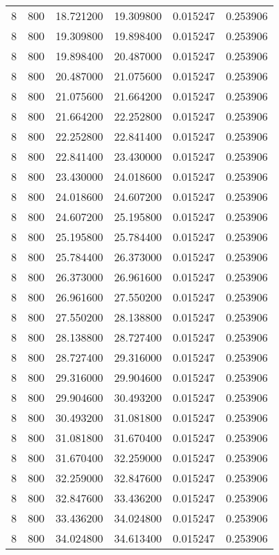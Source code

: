 \begin{longtable}{rrrrrr}
8 & 800 & 18.721200 & 19.309800 & 0.015247 & 0.253906 \\
8 & 800 & 19.309800 & 19.898400 & 0.015247 & 0.253906 \\
8 & 800 & 19.898400 & 20.487000 & 0.015247 & 0.253906 \\
8 & 800 & 20.487000 & 21.075600 & 0.015247 & 0.253906 \\
8 & 800 & 21.075600 & 21.664200 & 0.015247 & 0.253906 \\
8 & 800 & 21.664200 & 22.252800 & 0.015247 & 0.253906 \\
8 & 800 & 22.252800 & 22.841400 & 0.015247 & 0.253906 \\
8 & 800 & 22.841400 & 23.430000 & 0.015247 & 0.253906 \\
8 & 800 & 23.430000 & 24.018600 & 0.015247 & 0.253906 \\
8 & 800 & 24.018600 & 24.607200 & 0.015247 & 0.253906 \\
8 & 800 & 24.607200 & 25.195800 & 0.015247 & 0.253906 \\
8 & 800 & 25.195800 & 25.784400 & 0.015247 & 0.253906 \\
8 & 800 & 25.784400 & 26.373000 & 0.015247 & 0.253906 \\
8 & 800 & 26.373000 & 26.961600 & 0.015247 & 0.253906 \\
8 & 800 & 26.961600 & 27.550200 & 0.015247 & 0.253906 \\
8 & 800 & 27.550200 & 28.138800 & 0.015247 & 0.253906 \\
8 & 800 & 28.138800 & 28.727400 & 0.015247 & 0.253906 \\
8 & 800 & 28.727400 & 29.316000 & 0.015247 & 0.253906 \\
8 & 800 & 29.316000 & 29.904600 & 0.015247 & 0.253906 \\
8 & 800 & 29.904600 & 30.493200 & 0.015247 & 0.253906 \\
8 & 800 & 30.493200 & 31.081800 & 0.015247 & 0.253906 \\
8 & 800 & 31.081800 & 31.670400 & 0.015247 & 0.253906 \\
8 & 800 & 31.670400 & 32.259000 & 0.015247 & 0.253906 \\
8 & 800 & 32.259000 & 32.847600 & 0.015247 & 0.253906 \\
8 & 800 & 32.847600 & 33.436200 & 0.015247 & 0.253906 \\
8 & 800 & 33.436200 & 34.024800 & 0.015247 & 0.253906 \\
8 & 800 & 34.024800 & 34.613400 & 0.015247 & 0.253906 \\

\end{longtable}

